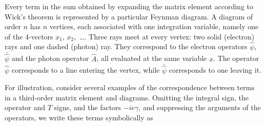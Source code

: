 Every term in the sum obtained by expanding the matrix element according to Wick's theorem is represented by a particular Feynman diagram. A diagram of order $n$ has $n$ vertices, each associated with one integration variable, namely one of the 4-vectors $x_1$, $x_2$,~\ldots. Three rays meet at every vertex: two solid (electron) rays and one dashed (photon) ray. They correspond to the electron operators $\hat\psi$, $\bar{\hat\psi}$ and the photon operator $\hat A$, all evaluated at the same variable $x$. The operator $\hat\psi$ corresponds to a line entering the vertex, while $\bar{\hat\psi}$ corresponds to one leaving it.

For illustration, consider several examples of the correspondence between terms in a third-order matrix element and diagrams. Omitting the integral sign, the operator and $T$ signs, and the factors $-ie\gamma$, and suppressing the arguments of the operators, we write these terms symbolically as
